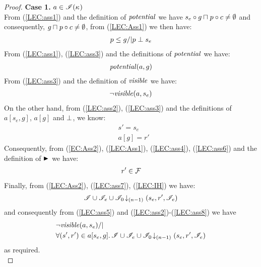 \begin{lemma}
\begin{proof}
\noindent\textbf{Case 1. } $a \in \mathscr{I}(\kappa_{})$\\ 
From (\ref{LEC:ass1}) and the definition of $\mathit{potential}$ we have $s_e \circ g \sqcap_{} p \circ c \not= \emptyset$ and consequently, $g \sqcap_{} p \circ c \not= \emptyset$, from (\ref{LEC:Ass1}) we then have:
%
\begin{align}
	p \leq g /| p \mathrel{\bot} s_e \label{LEC:ass3}
\end{align}
% 
From (\ref{LEC:ass1}), (\ref{LEC:ass3}) and the definitions of $\mathit{potential}$ we have:
%
\begin{align}
	\mathit{potential}(a, g) \label{LEC:ass4}
\end{align}
%
From (\ref{LEC:ass3}) and the definition of $\mathit{visible}$ we have:
%
\begin{align}
	\neg\mathit{visible}(a, s_e) 
	\label{LEC:ass5}
\end{align}
%
On the other hand, from (\ref{LEC:ass2}), (\ref{LEC:ass3}) and the definitions of $a[s_e, g]$, $a[g]$ and $\mathrel{\bot}$, we know: 
%
\begin{align}
	& s' = s_e  \label{LEC:ass5}\\
	& a[g] = r'  \label{LEC:ass6}
\end{align}
%
Consequently, from (\ref{EC:Ass2}), (\ref{LEC:Ass1}), (\ref{LEC:ass4}),  (\ref{LEC:ass6}) and the definition of $\strictfences$ we have:
%
\begin{align}
	r' \in \mathcal{F}_{}  \label{LEC:ass7}
\end{align}
%
Finally, from (\ref{LEC:Ass2}), (\ref{LEC:ass7}), (\ref{LEC:IH}) we have:
%
\begin{align}
	\mathscr{I} \cup \mathscr{I}_{e} \cup \mathscr{I}_0 \!\downarrow_{(n-1)} \left(s_e, r', \mathscr{I}_e\right)
	\label{LEC:ass8}
\end{align}
%
and consequently from (\ref{LEC:ass5}) and (\ref{LEC:ass2})-(\ref{LEC:ass8}) we have
%
\begin{align*}
	& \neg\mathit{visible}(a, s_e) /| \\
	& \forall (s', r') \in a[s_e, g].\, \mathscr{I} \cup \mathscr{I}_{e} \cup \mathscr{I}_0 \!\downarrow_{(n-1)} \left(s_e, r', \mathscr{I}_e\right)
\end{align*}
%
as required.\\
%
%
%
%


\end{proof}
\end{lemma}
